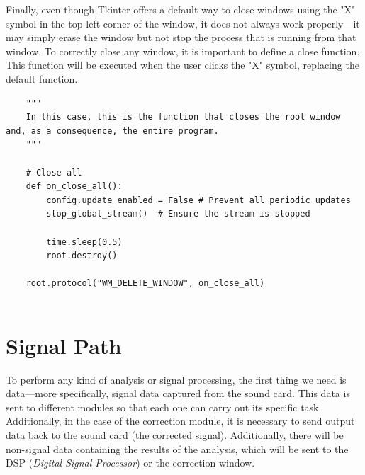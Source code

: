 Finally, even though Tkinter offers a default way to close windows using the "X" symbol in the top left corner of the window, it does not always work properly—it may simply erase the window but not stop the process that is running from that window. To correctly close any window, it is important to define a close function. This function will be executed when the user clicks the "X" symbol, replacing the default function.

\begin{verbatim}
	"""
	In this case, this is the function that closes the root window and, as a consequence, the entire program.
	"""
	
	# Close all
	def on_close_all():
		config.update_enabled = False # Prevent all periodic updates
		stop_global_stream()  # Ensure the stream is stopped
	
		time.sleep(0.5)
		root.destroy()
	
	root.protocol("WM_DELETE_WINDOW", on_close_all)
	
\end{verbatim}



\section{Signal Path}

To perform any kind of analysis or signal processing, the first thing we need is data—more specifically, signal data captured from the sound card. This data is sent to different modules so that each one can carry out its specific task. Additionally, in the case of the correction module, it is necessary to send output data back to the sound card (the corrected signal). Additionally, there will be non-signal data containing the results of the analysis, which will be sent to the DSP (\textit{Digital Signal Processor}) or the correction window.


